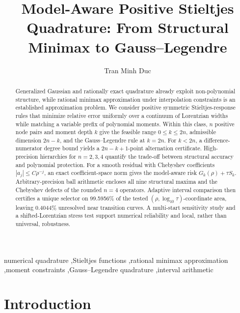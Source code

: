 \documentclass[preprint,12pt]{elsarticle}
\theoremstyle{remark}
\begin{document}
\begin{frontmatter}

\title{Model-Aware Positive Stieltjes Quadrature:
From Structural Minimax to Gauss--Legendre}

\author[inst1]{Tran Minh Duc}


\begin{abstract}
Generalized Gaussian and rationally exact quadrature already exploit
non-polynomial structure, while rational minimax approximation under
interpolation constraints is an established approximation problem. We
consider positive symmetric Stieltjes-response rules that minimize
relative error uniformly over a continuum of Lorentzian widths while
matching a variable prefix of polynomial moments. Within this class,
\(n\) positive node pairs and moment depth \(k\) give the feasible range
\(0\leq k\leq2n\), admissible dimension \(2n-k\), and the
Gauss--Legendre rule at \(k=2n\). For \(k<2n\), a
difference-numerator degree bound yields a \(2n-k+1\)-point
alternation certificate. High-precision hierarchies for \(n=2,3,4\)
quantify the trade-off between structural accuracy and polynomial
protection. For a smooth residual with Chebyshev coefficients
\(|a_j|\leq C\rho^{-j}\), an exact coefficient-space norm gives the
model-aware risk \(G_k(\rho)+\tau S_k\). Arbitrary-precision ball
arithmetic encloses all nine structural maxima and the Chebyshev
defects of the rounded \(n=4\) operators. Adaptive interval comparison
then certifies a unique selector on 99.5956\% of the
tested \((\rho,\log_{10}\tau)\)-coordinate area, leaving
0.4044\% unresolved near transition curves. A
multi-start sensitivity study and a shifted-Lorentzian stress test
support numerical reliability and local, rather than universal,
robustness.
\end{abstract}

\begin{keyword}
numerical quadrature \sep Stieltjes functions \sep rational minimax
approximation \sep moment constraints \sep Gauss--Legendre quadrature
\sep interval arithmetic
\end{keyword}

\end{frontmatter}

\section{Introduction}
\end{document}
